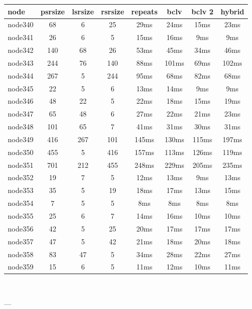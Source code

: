 \begin{tabular}{|l|c|c|c|c|c|c|c|}
\hline node & psrsize & lsrsize & rsrsize   & repeats & bclv & bclv 2 & hybrid\\
    \hline node340 & 68 & 6 & 25 & 29ms & 24ms & 15ms & 23ms\\
    \hline node341 & 26 & 6 & 5 & 15ms & 16ms & 9ms & 9ms\\
    \hline node342 & 140 & 68 & 26 & 53ms & 45ms & 34ms & 46ms\\
    \hline node343 & 244 & 76 & 140 & 88ms & 101ms & 69ms & 102ms\\
    \hline node344 & 267 & 5 & 244 & 95ms & 68ms & 82ms & 68ms\\
    \hline node345 & 22 & 5 & 6 & 13ms & 14ms & 9ms & 9ms\\
    \hline node346 & 48 & 22 & 5 & 22ms & 18ms & 15ms & 19ms\\
    \hline node347 & 65 & 48 & 6 & 27ms & 22ms & 21ms & 23ms\\
    \hline node348 & 101 & 65 & 7 & 41ms & 31ms & 30ms & 31ms\\
    \hline node349 & 416 & 267 & 101 & 145ms & 130ms & 115ms & 197ms\\
    \hline node350 & 455 & 5 & 416 & 157ms & 113ms & 126ms & 119ms\\
    \hline node351 & 701 & 212 & 455 & 248ms & 229ms & 205ms & 235ms\\
    \hline node352 & 19 & 7 & 5 & 12ms & 13ms & 9ms & 13ms\\
    \hline node353 & 35 & 5 & 19 & 18ms & 17ms & 13ms & 15ms\\
    \hline node354 & 7 & 5 & 5 & 8ms & 8ms & 8ms & 8ms\\
    \hline node355 & 25 & 6 & 7 & 14ms & 16ms & 10ms & 10ms\\
    \hline node356 & 42 & 5 & 25 & 20ms & 17ms & 17ms & 17ms\\
    \hline node357 & 47 & 5 & 42 & 21ms & 18ms & 20ms & 18ms\\
    \hline node358 & 83 & 47 & 5 & 34ms & 28ms & 22ms & 27ms\\
    \hline node359 & 15 & 6 & 5 & 11ms & 12ms & 10ms & 11ms\\

\hline
\end{tabular} \

---


